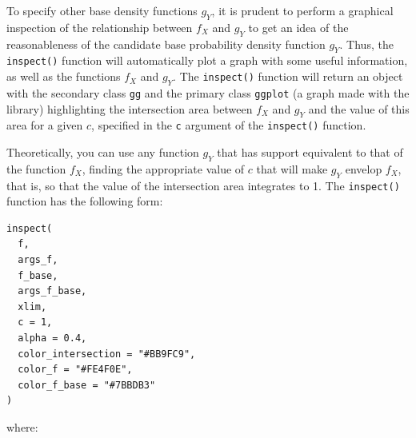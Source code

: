 To specify other base density functions \(g_Y\), it is prudent to perform a graphical inspection of the relationship between \(f_X\) and \(g_Y\) to get an idea of the reasonableness of the candidate base probability density function \(g_Y\). Thus, the \texttt{inspect()} function will automatically plot a graph with some useful information, as well as the functions \(f_X\) and \(g_Y\). The \texttt{inspect()} function will return an object with the secondary class \texttt{gg} and the primary class \texttt{ggplot} (a graph made with the  library) highlighting the intersection area between \(f_X\) and \(g_Y\) and the value of this area for a given \(c\), specified in the \texttt{c} argument of the \texttt{inspect()} function.

Theoretically, you can use any function \(g_Y\) that has support equivalent to that of the function \(f_X\), finding the appropriate value of \(c\) that will make \(g_Y\) envelop \(f_X\), that is, so that the value of the intersection area integrates to 1. The \texttt{inspect()} function has the following form:

\begin{verbatim}
inspect(
  f,
  args_f,
  f_base,
  args_f_base,
  xlim,
  c = 1,
  alpha = 0.4,
  color_intersection = "#BB9FC9",
  color_f = "#FE4F0E",
  color_f_base = "#7BBDB3"
)
\end{verbatim}

where:

